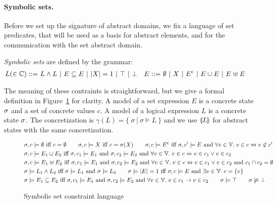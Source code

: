 \paragraph{Symbolic sets.}
Before we set up the signature of abstract domains, we fix a language
of set predicates, that will be used as a basis for abstract elements,
and for the communication with the set abstract domain.
\begin{definition}
  \label{d:1:symsets}
  {\em Symbolic sets} are defined by the grammar:
  \begin{align*}
    L (\in \mathbb{C}) ::=
    & \ L \wedge L \
    | \ E \subseteq E \
    | \ |{X}| = 1 \
    | \ \top \
    | \ \bot
    & E ::=
    & \ \emptyset \ | \ X \ | \ {E}^{\mathrm{c}} \ | \ E \cup E \ | \ E \mathrel{\uplus} E
  \end{align*}
\end{definition}
The meaning of these contraints is straightforward, but we give a formal
definition in Figure~\ref{f:4:symsets} for clarity.
A model of a set expression $E$ is a concrete state $\sigma$ and a set
of concrete values $c$.
A model of a logical expression $L$ is a concrete state $\sigma$.
The concretization is $\gamma(L) = \{\ \sigma \ |\  \sigma \models L\ \}$
and we use $\llparenthesis L \rrparenthesis$ for abstract states with the same concretization.
\begin{figure}[t]
  \begin{align*}
    & \sigma, c \models \emptyset \textrm{ iff } c = \emptyset
    \qquad
    \sigma, c \models X \textrm{ iff } c = \sigma(X)
    \qquad \sigma, c \models {E}^{\mathrm{c}}
    \textrm{ iff }
    \sigma, c' \models{E}
    \textrm{ and } \forall v \in \mathbb{V}.
    \; v \in c \Leftrightarrow v \not\in c'
    \\
    & \sigma, c \models E_1 \cup E_2
    \textrm{ iff }
    \sigma, c_1 \models E_1
    \textrm{ and } \sigma, c_2 \models E_2
    \textrm{ and }
    \forall v \in \mathbb{V}. \; v \in c \Leftrightarrow v \in c_1 \vee
    v \in c_2
    \\
    & \sigma, c \models E_1 \mathrel{\uplus} E_2
    \textrm{ iff }
    \sigma, c_1 \models E_1
    \textrm{ and } \sigma, c_2 \models E_2
    \textrm{ and }
    \forall v \in \mathbb{V}. \; v \in c \Leftrightarrow v \in c_1 \vee
    v \in c_2
    \textrm{ and } c_1 \cap c_2 = \emptyset
    \\
    & \sigma \models L_1 \wedge L_2
    \textrm{ iff }
    \sigma \models L_1 \textrm{ and } \sigma \models L_2
    \qquad
    \sigma \models |{E}| = 1
    \textrm{ iff }
    \sigma, c \models E \textrm{ and } \exists v \in \mathbb{V}. \; c = \{ v \}
    \\
    & \sigma \models E_1 \subseteq E_2
    \textrm{ iff }
    \sigma, c_1 \models E_1 \textrm{ and } \sigma, c_2 \models E_2
    \textrm{ and } \forall v \in \mathbb{V}. \; v \in c_1 \rightarrow v \in c_2
    \qquad \sigma \models \top
    \qquad \sigma \not\models \bot
  \end{align*}
  \caption{Symbolic set constraint language}
  \label{f:4:symsets}
\end{figure}

